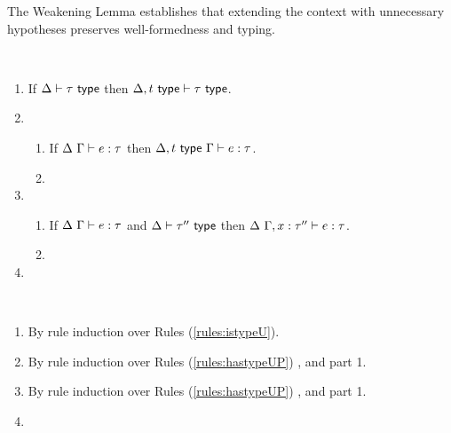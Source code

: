 The Weakening Lemma establishes that extending the context with unnecessary hypotheses preserves well-formedness and typing.
\begin{lemma}[Weakening]\label{lemma:weakening-UP}\label{lemma:weakening-U} ~
\begin{enumerate} 
\item If $\Delta \vdash \tau~\mathsf{type}$ then $\Delta, t~\mathsf{type} \vdash \tau~\mathsf{type}$.
\item \begin{enumerate}
  \item If $\Delta~\Gamma \vdash e : \tau$ then $\Delta, t~\mathsf{type}~\Gamma \vdash e : \tau$.
  \item {}
  \end{enumerate}
\item \begin{enumerate}
  \item If $\Delta~\Gamma \vdash e : \tau$ and $\Delta \vdash \tau''~\mathsf{type}$ then $\Delta~\Gamma, x : \tau'' \vdash e : \tau$.
  \item {}
  \end{enumerate}
\item {}
\end{enumerate}
\end{lemma}
\begin{proof-sketch} ~
\begin{enumerate}
\item By rule induction over Rules (\ref{rules:istypeU}).
\item By  rule induction over Rules (\ref{rules:hastypeUP}) , and part 1.
\item By  rule induction over Rules (\ref{rules:hastypeUP}) , and part 1.
\item {}
\end{enumerate}
\end{proof-sketch}

